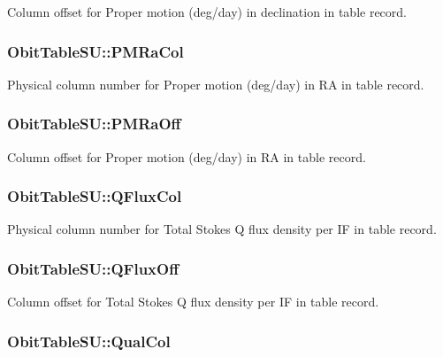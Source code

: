 Column offset for Proper motion (deg/day) in declination in table record. 

\subsubsection{ {\bf Obit\-Table\-SU::PMRa\-Col}}\label{structObitTableSU_o36}


Physical column number for Proper motion (deg/day) in RA in table record. 

\subsubsection{ {\bf Obit\-Table\-SU::PMRa\-Off}}\label{structObitTableSU_o35}


Column offset for Proper motion (deg/day) in RA in table record. 

\subsubsection{ {\bf Obit\-Table\-SU::QFlux\-Col}}\label{structObitTableSU_o46}


Physical column number for Total Stokes Q flux density per IF in table record. 

\subsubsection{ {\bf Obit\-Table\-SU::QFlux\-Off}}\label{structObitTableSU_o45}


Column offset for Total Stokes Q flux density per IF in table record. 

\subsubsection{ {\bf Obit\-Table\-SU::Qual\-Col}}\label{structObitTableSU_o22}


